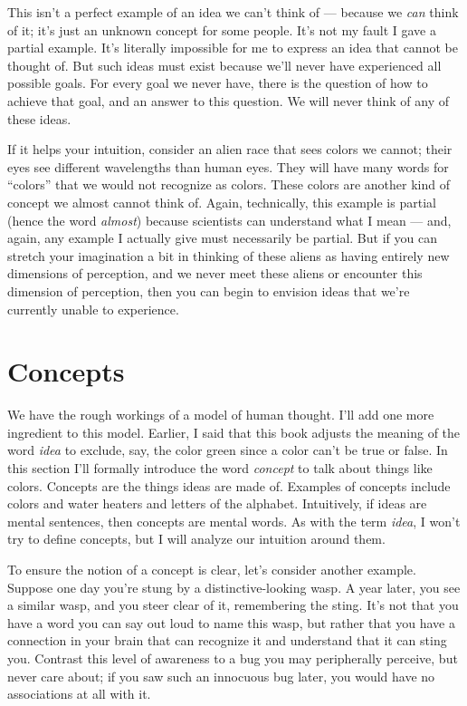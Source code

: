 \documentclass[9pt, twoside]{book}
\theoremstyle{argtstyle}
\begin{document}
This isn't a perfect example of an idea we can't think of --- because we {\em
can} think of it; it's just an unknown concept for some people.
It's not my fault I
gave a partial example.
It's literally impossible for me to express an idea that
cannot be thought of.
But such ideas must exist because we'll never
have experienced all possible goals.
For every goal we never have,
there is the question of how to achieve that goal, and an answer to this
question. We will never think of any of these ideas.

If it helps your intuition, consider an alien race that sees colors we cannot;
their eyes see different wavelengths than human eyes.
They will have many words for ``colors''
that we would not recognize as colors. These colors are another kind of concept
we almost cannot think of.
Again, technically, this example is
partial (hence the word {\em almost})
because scientists can understand what I mean --- and, again, any
example I actually give must necessarily be partial. But if you can stretch your
imagination a bit in thinking of these aliens as having entirely new dimensions
of perception, and we never meet these aliens or encounter this dimension of
perception, then you can begin to envision ideas that we're currently
unable to experience.

\section{Concepts}\label{s_mental_words}

We have the rough workings of a model of human thought.
I'll add one more
ingredient to this model.
Earlier, I said that this book adjusts the meaning of the word
{\em idea} to exclude, say, the color green since a color
can't be true or false.
In this section I'll formally introduce the word {\em concept} to talk about
things like colors.
Concepts are
the things ideas are made of.
Examples of concepts include
colors and water heaters and letters of the alphabet.
Intuitively, if
ideas are mental sentences, then
concepts are mental words.
As with the term {\em idea}, I won't try to define concepts,
but I will analyze our intuition around them.

To ensure the notion of a concept is clear, let's consider another example.
Suppose one day you're stung
by a distinctive-looking wasp.
A year later, you see a similar wasp, and you
steer clear of it, remembering the sting.
It's not that you have a word you can say out loud to name this wasp,
but rather that you have a connection in your brain that can recognize it and
understand that it can sting you.
Contrast this level of awareness to a bug you may peripherally perceive, but
never care about; if you saw such an innocuous bug later, you would have no
associations at all with it.
\end{document}
